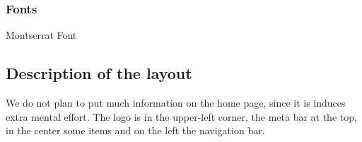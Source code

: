 \documentclass[]{article}
\begin{document}
\subsubsection*{Fonts}
Montserrat Font

\subsection*{Description of the layout}
We do not plan to put much information on the home page, since it is induces extra mental effort. The logo is in the upper-left corner, the meta bar at the top, in the center some items and on the left the navigation bar.
	
\end{document}
